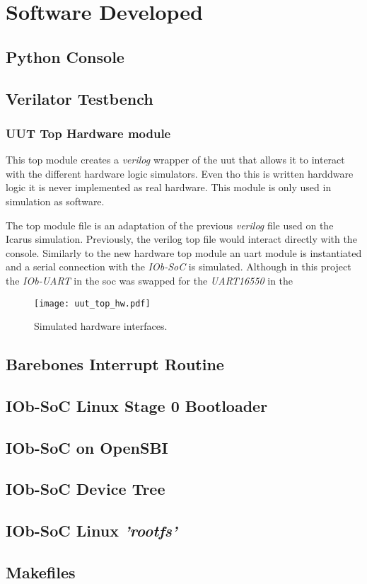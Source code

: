 \chapter{Software Developed}

\section{Python Console}

\section{Verilator Testbench}
\subsection{UUT Top Hardware module}
\label{section:uut}
This top module creates a \textit{verilog} wrapper of the \acrfull{uut} that allows it to interact with the different hardware logic simulators. Even tho this is written harddware logic it is never implemented as real hardware. This module is only used in simulation as software.

The top module file is an adaptation of the previous \textit{verilog} file used on the Icarus simulation. Previously, the verilog top file would interact directly with the console. Similarly to the new hardware top module an \acrshort{uart} module is instantiated and a serial connection with the \textit{IOb-SoC} is simulated. Although in this project the \textit{IOb-UART} in the \acrfull{soc} was swapped for the \textit{UART16550} in the 

\begin{figure}[!ht]
    \centering
    \texttt{[image: uut\_top\_hw.pdf]}
    \caption{Simulated hardware interfaces.}
    \label{fig:uut_top_hw}
\end{figure}

\section{Barebones Interrupt Routine}

\section{IOb-SoC Linux Stage 0 Bootloader}

\section{IOb-SoC on OpenSBI}

\section{IOb-SoC Device Tree}

\section{IOb-SoC Linux \textit{'rootfs'}}

\section{Makefiles}